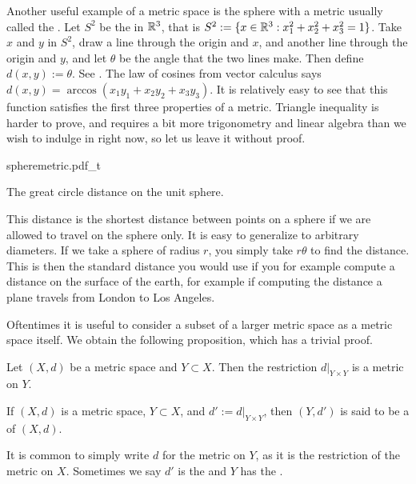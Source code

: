 \begin{example}
Another useful example of a metric space is the sphere
with a metric usually called the \emph{}.
Let $S^2$ be the  in ${\mathbb{R}}^3$,
that is $S^2 := \{ x \in {\mathbb{R}}^3 : x_1^2+x_2^2+x_3^2 = 1 \}$.
Take $x$ and $y$ in $S^2$, draw a line through the origin and $x$,
and another line through the origin and $y$,
and let $\theta$ be the angle that the two lines make.
Then define $d(x,y) := \theta$.  See .
The law of cosines from vector calculus says
$d(x,y) = \arccos(x_1y_1+x_2y_2+x_3y_3)$.
It is relatively easy to see that this function satisfies the first three
properties of a metric.
Triangle inequality is harder to prove, and requires a bit more
trigonometry and linear algebra than we wish to indulge in right now, so let
us leave it without proof.

\begin{myfigureht}
{spheremetric.pdf_t}
\caption{The great circle distance on the unit
sphere.\label{fig:spheremetric}}
\end{myfigureht}

This distance is the shortest distance between points on a sphere if
we are allowed to travel on the sphere only.  It is easy to
generalize to arbitrary diameters.  If we take a sphere of radius
$r$, you simply take $r \theta$ to find the distance.  This is then the
standard distance you would use if you for example compute a distance on the
surface of the earth, for example if computing the distance a plane travels from London to
Los Angeles.
\end{example}

Oftentimes it is useful to consider a subset of a larger metric space
as a metric space itself.  We obtain the following proposition, which has
a trivial proof.

\begin{prop}
Let $(X,d)$ be a metric space and $Y \subset X$.  Then the restriction
$d|_{Y \times Y}$ is a metric on $Y$.
\end{prop}

\begin{defn}
If $(X,d)$ is a metric space, $Y \subset X$, and $d' := d|_{Y \times Y}$,
then $(Y,d')$ is said to be a \emph{} of $(X,d)$.
\end{defn}

It is common to simply write $d$ for the metric on $Y$, as it is 
the restriction of the metric on $X$.  Sometimes we say $d'$ is
the \emph{} and $Y$ has the
\emph{}.

